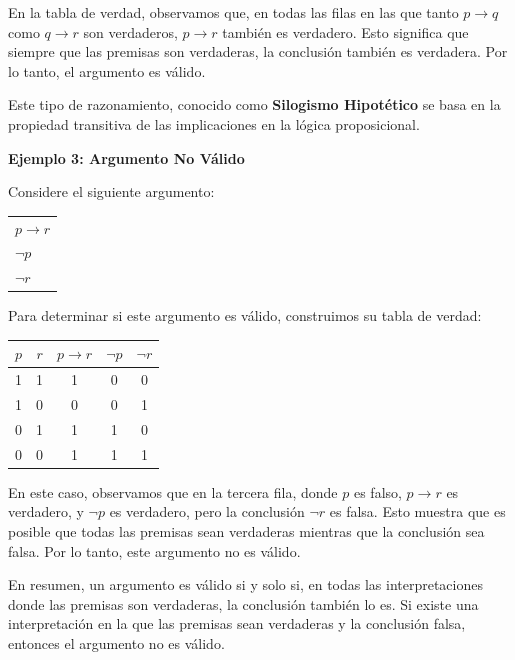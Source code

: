 En la tabla de verdad, observamos que, en todas las filas en las que tanto \( p \rightarrow q \) como \( q \rightarrow r \) son verdaderos, \( p \rightarrow r \) también es verdadero. Esto significa que siempre que las premisas son verdaderas, la conclusión también es verdadera. Por lo tanto, el argumento es válido.


Este tipo de razonamiento, conocido como \textbf{Silogismo Hipotético} se basa en la propiedad transitiva de las implicaciones en la lógica proposicional.



\bigskip  


\textbf{Ejemplo 3: Argumento No Válido}

Considere el siguiente argumento:

\begin{center}
\begin{tabular}{l}
$p \rightarrow r$ \\
$\lnot p$ \\
\hline
$\lnot r$
\end{tabular}
\end{center}


Para determinar si este argumento es válido, construimos su tabla de verdad:

\begin{center}
\begin{tabular}{|c|c|c|c|c|}
\hline
$p$ & $r$ & $p \rightarrow r$ & $\lnot p$ & $\lnot r$ \\
\hline
1 & 1 & 1 & 0 & 0 \\
1 & 0 & 0 & 0 & 1 \\
0 & 1 & 1 & 1 & 0 \\
0 & 0 & 1 & 1 & 1 \\
\hline
\end{tabular}
\end{center}

En este caso, observamos que en la tercera fila, donde \( p \) es falso, \( p \rightarrow r \) es verdadero, y \( \lnot p \) es verdadero, pero la conclusión \( \lnot r \) es falsa. Esto muestra que es posible que todas las premisas sean verdaderas mientras que la conclusión sea falsa. Por lo tanto, este argumento no es válido.

\bigskip

En resumen, un argumento es válido si y solo si, en todas las interpretaciones donde las premisas son verdaderas, la conclusión también lo es. Si existe una interpretación en la que las premisas sean verdaderas y la conclusión falsa, entonces el argumento no es válido.